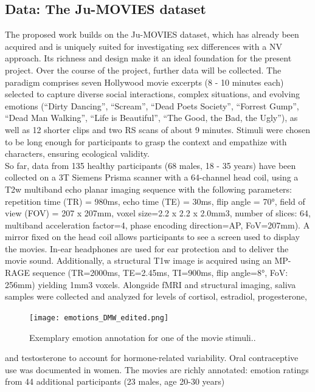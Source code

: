 \documentclass[11pt,a4paper]{article}
\begin{document}
\subsection*{Data: The Ju-MOVIES dataset}
The proposed work builds on the Ju-MOVIES dataset, which has already been acquired and is 
uniquely suited for investigating sex differences with a NV approach. Its richness and design make it an ideal foundation for the present project. 
Over the course of the project, further data will be collected.
The paradigm comprises seven Hollywood movie excerpts (8 - 10 minutes each) selected to capture diverse social 
interactions, complex situations, and evolving emotions (“Dirty Dancing”, “Scream”, “Dead Poets Society”, “Forrest Gump”, “Dead Man Walking”, “Life is Beautiful”, 
“The Good, the Bad, the Ugly”), as well as 12 shorter clips and two RS scans of about 9 minutes.
Stimuli were chosen to be long enough for participants to grasp the context and empathize with characters, 
ensuring ecological validity.\\
So far, data from 135 healthy participants (68 males, 18 - 35 years) have been collected 
on a 3T Siemens Prisma scanner
with a 64-channel head coil, using a T2w multiband echo planar imaging sequence with the 
following parameters: repetition time (TR) = 980ms, echo time (TE) = 30ms, flip angle = 70°, field of view 
(FOV) = 207 x 207mm, voxel size=2.2 x 2.2 x 2.0mm3, number of slices: 64, multiband acceleration factor=4, 
phase encoding direction=AP,  FoV=207mm). A mirror fixed on the head coil allows participants to see a screen used 
to display the movies. In-ear headphones are used for ear protection and to deliver the movie sound. 
Additionally, a structural T1w image is acquired using an MP-RAGE sequence (TR=2000ms, TE=2.45ms, TI=900ms, 
flip angle=8°, FoV: 256mm) yielding 1mm3 voxels.
Alongside fMRI and structural imaging, saliva samples were collected and analyzed for levels of cortisol, estradiol, progesterone,
\begin{figure} %
  \vspace{-10pt} %
  \texttt{[image: emotions\_DMW\_edited.png]}
  \caption{Exemplary emotion annotation for one of the movie stimuli..}
  \label{fig:dmw}
\end{figure}
 and testosterone to account for hormone-related variability. 
Oral contraceptive use was documented in women.
The movies are richly annotated: 
emotion ratings from 44 additional participants (23 males, age 20-30 years)
\end{document}
